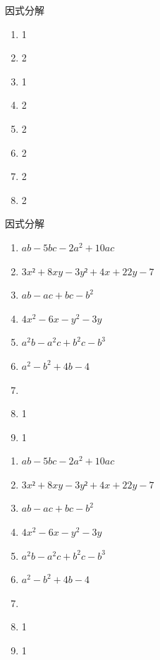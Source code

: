 \begin{homework}因式分解
    \begin{enumerate}[(1)]
        \item 1
        \item 2
        \item 1
        \item 2
        \item 2
        \item 2
        \item 2
        \item 2
    \end{enumerate}

\end{homework}
\begin{homework}
    因式分解

    \begin{minipage}{0.45\textwidth}
         \begin{enumerate}[(1)]
        \item \(ab-5bc-2a^2+10ac\)
        \item $3x²+8xy-3y²+4x+22y-7$
        \item \(ab-ac+bc-b^2\)
        \item \(4x^2-6x-y^2-3y\)
        \item \(a^2b-a^2c+b^2c-b^3\)
        \item \(a^2-b^2+4b-4\)
        \item \(\)
        \item 1
        \item 1
    \end{enumerate}
    \end{minipage}
    \hfill
    \begin{minipage}{0.45\textwidth}
        \begin{enumerate}[(1)]
            \addtocounter{enumi}{+9}   
            \item \(ab-5bc-2a^2+10ac\)
            \item $3x²+8xy-3y²+4x+22y-7$
            \item \(ab-ac+bc-b^2\)
            \item \(4x^2-6x-y^2-3y\)
            \item \(a^2b-a^2c+b^2c-b^3\)
            \item \(a^2-b^2+4b-4\)
            \item \(\)
            \item 1
            \item 1
        \end{enumerate}
    \end{minipage}
   

\end{homework}
\begin{homework}

        
\end{homework}
\clearpage
